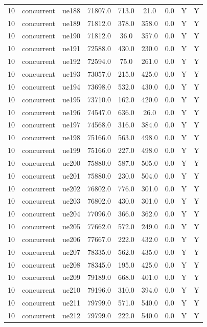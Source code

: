 \begin{table}[ht]
\begin{tabular}{|c|c|c|c|c|c|c|c|c|}
10 & concurrent & ue188 & 71807.0 & 713.0 & 21.0 & 0.0 & Y & Y \\
10 & concurrent & ue189 & 71812.0 & 378.0 & 358.0 & 0.0 & Y & Y \\
10 & concurrent & ue190 & 71812.0 & 36.0 & 357.0 & 0.0 & Y & Y \\
10 & concurrent & ue191 & 72588.0 & 430.0 & 230.0 & 0.0 & Y & Y \\
10 & concurrent & ue192 & 72594.0 & 75.0 & 261.0 & 0.0 & Y & Y \\
10 & concurrent & ue193 & 73057.0 & 215.0 & 425.0 & 0.0 & Y & Y \\
10 & concurrent & ue194 & 73698.0 & 532.0 & 430.0 & 0.0 & Y & Y \\
10 & concurrent & ue195 & 73710.0 & 162.0 & 420.0 & 0.0 & Y & Y \\
10 & concurrent & ue196 & 74547.0 & 636.0 & 26.0 & 0.0 & Y & Y \\
10 & concurrent & ue197 & 74568.0 & 316.0 & 384.0 & 0.0 & Y & Y \\
10 & concurrent & ue198 & 75166.0 & 563.0 & 498.0 & 0.0 & Y & Y \\
10 & concurrent & ue199 & 75166.0 & 227.0 & 498.0 & 0.0 & Y & Y \\
10 & concurrent & ue200 & 75880.0 & 587.0 & 505.0 & 0.0 & Y & Y \\
10 & concurrent & ue201 & 75880.0 & 230.0 & 504.0 & 0.0 & Y & Y \\
10 & concurrent & ue202 & 76802.0 & 776.0 & 301.0 & 0.0 & Y & Y \\
10 & concurrent & ue203 & 76802.0 & 430.0 & 301.0 & 0.0 & Y & Y \\
10 & concurrent & ue204 & 77096.0 & 366.0 & 362.0 & 0.0 & Y & Y \\
10 & concurrent & ue205 & 77662.0 & 572.0 & 249.0 & 0.0 & Y & Y \\
10 & concurrent & ue206 & 77667.0 & 222.0 & 432.0 & 0.0 & Y & Y \\
10 & concurrent & ue207 & 78335.0 & 562.0 & 435.0 & 0.0 & Y & Y \\
10 & concurrent & ue208 & 78345.0 & 195.0 & 425.0 & 0.0 & Y & Y \\
10 & concurrent & ue209 & 79189.0 & 668.0 & 401.0 & 0.0 & Y & Y \\
10 & concurrent & ue210 & 79196.0 & 310.0 & 394.0 & 0.0 & Y & Y \\
10 & concurrent & ue211 & 79799.0 & 571.0 & 540.0 & 0.0 & Y & Y \\
10 & concurrent & ue212 & 79799.0 & 222.0 & 540.0 & 0.0 & Y & Y \\

\end{tabular}
\end{table}
